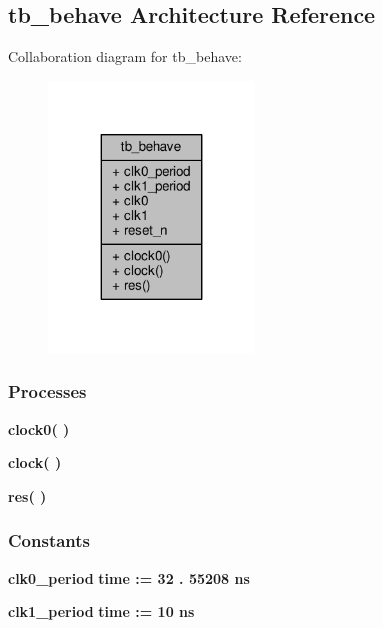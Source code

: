 \subsection{tb\+\_\+behave Architecture Reference}
\label{classslaveFIFO5b__tb_1_1tb__behave}


Collaboration diagram for tb\+\_\+behave\+:\nopagebreak
\begin{figure}[H]
\begin{center}
\leavevmode
\includegraphics[width=155pt]{d8/dff/classslaveFIFO5b__tb_1_1tb__behave__coll__graph}
\end{center}
\end{figure}
\subsubsection*{Processes}
 \begin{DoxyCompactItemize}
\item 
{\bf clock0}{\bfseries  (  )}
\item 
{\bf clock}{\bfseries  (  )}
\item 
{\bf res}{\bfseries  (  )}
\end{DoxyCompactItemize}
\subsubsection*{Constants}
 \begin{DoxyCompactItemize}
\item 
{\bf clk0\+\_\+period} {\bfseries \textcolor{comment}{time}\textcolor{vhdlchar}{ }\textcolor{vhdlchar}{ }\textcolor{vhdlchar}{\+:}\textcolor{vhdlchar}{=}\textcolor{vhdlchar}{ }\textcolor{vhdlchar}{ }\textcolor{vhdlchar}{ } \textcolor{vhdldigit}{32} \textcolor{vhdlchar}{.} \textcolor{vhdldigit}{55208} \textcolor{vhdlchar}{ }\textcolor{vhdlchar}{ns}\textcolor{vhdlchar}{ }} 
\item 
{\bf clk1\+\_\+period} {\bfseries \textcolor{comment}{time}\textcolor{vhdlchar}{ }\textcolor{vhdlchar}{ }\textcolor{vhdlchar}{\+:}\textcolor{vhdlchar}{=}\textcolor{vhdlchar}{ }\textcolor{vhdlchar}{ }\textcolor{vhdlchar}{ } \textcolor{vhdldigit}{10} \textcolor{vhdlchar}{ }\textcolor{vhdlchar}{ns}\textcolor{vhdlchar}{ }} 
\end{DoxyCompactItemize}
